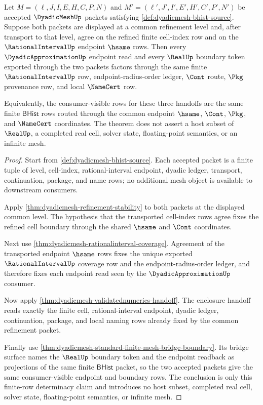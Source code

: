 \begin{theorem}
\label{thm:dyadicmesh-common-refinement-endpoint-determinacy}
Let
$M=(\ell,J,I,E,H,C,P,N)$ and
$M'=(\ell',J',I',E',H',C',P',N')$ be accepted $\DyadicMeshUp$
packets satisfying \autoref{def:dyadicmesh-bhist-source}. Suppose both
packets are displayed at a common refinement level and, after transport to
that level, agree on the refined finite cell-index row and on the
$\RationalIntervalUp$ endpoint $\hsame$ rows. Then every
$\DyadicApproximationUp$ endpoint read and every $\RealUp$ boundary token
exported through the two packets factors through the same finite
$\RationalIntervalUp$ row, endpoint-radius-order ledger, $\Cont$ route,
$\Pkg$ provenance row, and local $\NameCert$ row.

Equivalently, the consumer-visible rows for these three handoffs are the
same finite $\mathsf{BHist}$ rows routed through the common endpoint
$\hsame$, $\Cont$, $\Pkg$, and $\NameCert$ coordinates. The theorem does not
assert a host subset of $\RealUp$, a completed real cell, solver state,
floating-point semantics, or an infinite mesh.
\end{theorem}
\begin{proof}
Start from \autoref{def:dyadicmesh-bhist-source}. Each accepted packet is a
finite tuple of level, cell-index, rational-interval endpoint, dyadic ledger,
transport, continuation, package, and name rows; no additional mesh object is
available to downstream consumers.

Apply \autoref{thm:dyadicmesh-refinement-stability} to both packets at the
displayed common level. The hypothesis that the transported cell-index rows
agree fixes the refined cell boundary through the shared $\hsame$ and
$\Cont$ coordinates.

Next use \autoref{thm:dyadicmesh-rationalinterval-coverage}. Agreement of
the transported endpoint $\hsame$ rows fixes the unique exported
$\RationalIntervalUp$ coverage row and the endpoint-radius-order ledger, and
therefore fixes each endpoint read seen by the $\DyadicApproximationUp$
consumer.

Now apply \autoref{thm:dyadicmesh-validatednumerics-handoff}. The enclosure
handoff reads exactly the finite cell, rational-interval endpoint, dyadic
ledger, continuation, package, and local naming rows already fixed by the
common refinement packet.

Finally use
\autoref{thm:dyadicmesh-standard-finite-mesh-bridge-boundary}. Its bridge
surface names the $\RealUp$ boundary token and the endpoint readback as
projections of the same finite $\mathsf{BHist}$ packet, so the two accepted
packets give the same consumer-visible endpoint and boundary rows. The
conclusion is only this finite-row determinacy claim and introduces no host
subset, completed real cell, solver state, floating-point semantics, or
infinite mesh.
\end{proof}

